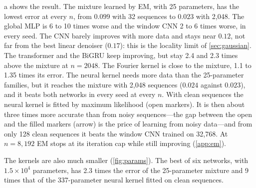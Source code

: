 \documentclass{article}
\begin{document}
a shows the result. The mixture learned by EM, with 25 parameters, has the lowest error at every $n$,
from $0.099$ with 32 sequences to $0.023$ with 2{,}048. The global MLP is 6 to 10 times worse and the window CNN 2 to 6
times worse, in every seed. The CNN barely improves with more data and stays near $0.12$, not far from the best linear
denoiser ($0.17$): this is the locality limit of \cref{sec:gaussian}. The transformer and the BiGRU keep improving,
but stay 2.4 and 2.3 times above the mixture at $n=2048$. The Fourier kernel is close to the mixture, 1.1 to
1.35 times its error. The neural kernel needs more data than the 25-parameter families, but it reaches the mixture with
2{,}048 sequences ($0.024$ against $0.023$), and it beats both networks in every seed at every $n$. With clean sequences
the neural kernel is fitted by maximum likelihood (open markers). It is then about three times more accurate than from
noisy sequences---the gap between the open and the filled markers (arrow) is the price of learning from noisy
data---and from only 128 clean sequences it beats the window CNN trained on 32{,}768. At $n=8{,}192$ EM stops at its
iteration cap while still improving (\cref{app:em}).


The kernels are also much smaller (\cref{fig:params}). The best of six networks, with $1.5\times10^4$ parameters, has
2.3 times the error of the 25-parameter mixture and 9 times that of the 337-parameter neural kernel fitted on clean
sequences.
\end{document}
